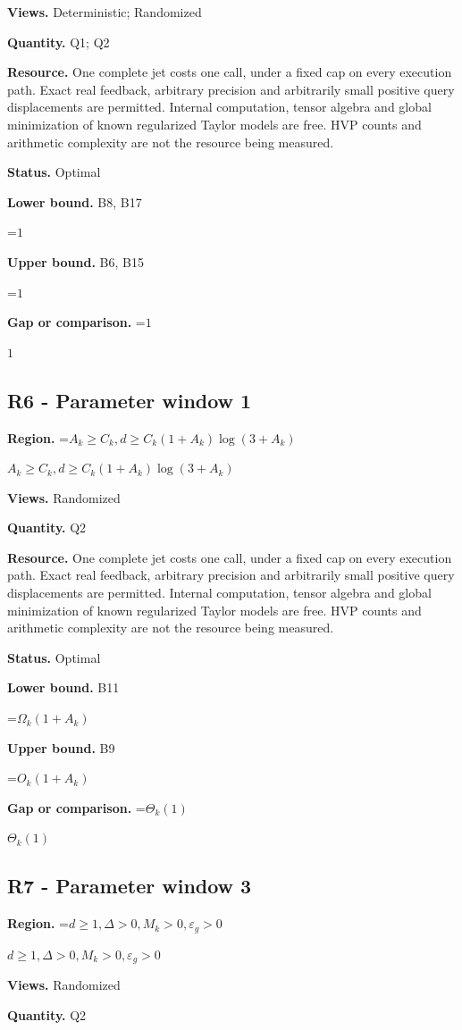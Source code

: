 \documentclass[10pt,a4paper]{article}
\newcommand{\AtlasMath}[1]{\par\begingroup\centering\setbox0=\hbox{$\displaystyle #1$}\ifdim\wd0>1.4\linewidth\typeout{ATLAS WIDE FORMULA: \the\wd0}\fi\ifdim\wd0>\linewidth\resizebox{\linewidth}{!}{\box0}\else\box0\fi\par\endgroup}
\newcommand{\AtlasInlineMath}[1]{\begingroup\setbox0=\hbox{$#1$}\ifdim\wd0>.4\linewidth\endgroup\AtlasMath{#1}\else\endgroup$#1$\fi}
\begin{document}
\textbf{Views.} Deterministic; Randomized

\textbf{Quantity.} Q1; Q2

\textbf{Resource.} One complete jet costs one call, under a fixed cap on every execution path. Exact real feedback, arbitrary precision and arbitrarily small positive query displacements are permitted. Internal computation, tensor algebra and global minimization of known regularized Taylor models are free. HVP counts and arithmetic complexity are not the resource being measured.

\textbf{Status.} Optimal

\textbf{Lower bound.} B8, B17

\AtlasMath{1}
\textbf{Upper bound.} B6, B15

\AtlasMath{1}
\textbf{Gap or comparison.} \AtlasInlineMath{1}

\subsection{R6 - Parameter window 1}
\textbf{Region.} \AtlasInlineMath{A_k\ge C_k, d\ge C_k(1+A_k)\log(3+A_k)}

\textbf{Views.} Randomized

\textbf{Quantity.} Q2

\textbf{Resource.} One complete jet costs one call, under a fixed cap on every execution path. Exact real feedback, arbitrary precision and arbitrarily small positive query displacements are permitted. Internal computation, tensor algebra and global minimization of known regularized Taylor models are free. HVP counts and arithmetic complexity are not the resource being measured.

\textbf{Status.} Optimal

\textbf{Lower bound.} B11

\AtlasMath{\Omega_k(1+A_k)}
\textbf{Upper bound.} B9

\AtlasMath{O_k(1+A_k)}
\textbf{Gap or comparison.} \AtlasInlineMath{\Theta_k(1)}

\subsection{R7 - Parameter window 3}
\textbf{Region.} \AtlasInlineMath{d\ge 1, \Delta>0, M_k>0, \varepsilon_g>0}

\textbf{Views.} Randomized

\textbf{Quantity.} Q2
\end{document}
